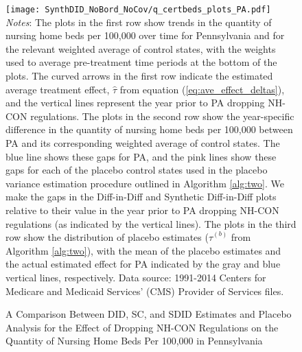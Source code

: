 \documentclass[../Main.tex]{subfiles}
\begin{document}
\newpage
{}
\begin{figure}[t] 
    \setlength{}
	\caption{\label{fig:q_certbeds_plots_pa} \centering A Comparison Between DID, SC, and SDID Estimates and Placebo Analysis for the Effect of Dropping NH-CON Regulations on the Quantity of Nursing Home Beds Per 100,000 in Pennsylvania} {\centering\texttt{[image: SynthDID\_NoBord\_NoCov/q\_certbeds\_plots\_PA.pdf]}}
    \vspace{-1.4cm}\\
    \scriptsize
		\textit{Notes}: The plots in the first row show trends in the quantity of nursing home beds per 100,000 over time for Pennsylvania and for the relevant weighted average of control states, with the weights used to average pre-treatment time periods at the bottom of the plots. The curved arrows in the first row indicate the estimated average treatment effect, $\hat{\tau}$ from equation (\ref{eq:ave_effect_deltas}), and the vertical lines represent the year prior to PA dropping NH-CON regulations. The plots in the second row show the year-specific difference in the quantity of nursing home beds per 100,000 between PA and its corresponding weighted average of control states. The blue line shows these gaps for PA, and the pink lines show these gaps for each of the placebo control states used in the placebo variance estimation procedure outlined in Algorithm \ref{alg:two}. We make the gaps in the Diff-in-Diff and Synthetic Diff-in-Diff plots relative to their value in the year prior to PA dropping NH-CON regulations (as indicated by the vertical lines). The plots in the third row show the distribution of placebo estimates ($\hat{\tau}^{(b)}$ from Algorithm \ref{alg:two}), with the mean of the placebo estimates and the actual estimated effect for PA indicated by the gray and blue vertical lines, respectively. Data source: 1991-2014 Centers for Medicare and Medicaid Services’ (CMS) Provider of Services files.
\end{figure}
\restoregeometry
\clearpage
\end{document}
